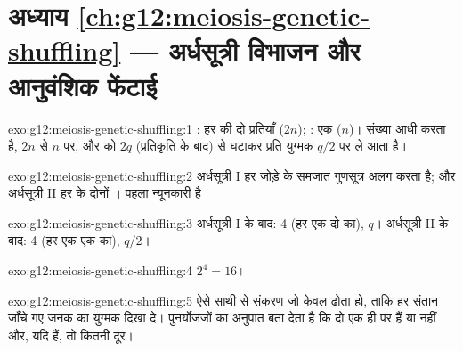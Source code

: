 \section*{अध्याय \ref{ch:g12:meiosis-genetic-shuffling} --- अर्धसूत्री विभाजन और आनुवंशिक फेंटाई}

\begin{solution}{exo:g12:meiosis-genetic-shuffling:1}
: हर  की दो प्रतियाँ ($2n$); : एक ($n$)।   संख्या आधी करता है, $2n$ से $n$ पर, और  को $2q$
(प्रतिकृति के बाद) से घटाकर प्रति युग्मक $q/2$ पर ले आता है।
\end{solution}

\begin{solution}{exo:g12:meiosis-genetic-shuffling:2}
अर्धसूत्री I हर जोड़े के समजात गुणसूत्र अलग करता है; और अर्धसूत्री II हर
 के दोनों । पहला न्यूनकारी है।
\end{solution}

\begin{solution}{exo:g12:meiosis-genetic-shuffling:3}
अर्धसूत्री I के बाद: 4  (हर एक दो  का),  $q$। अर्धसूत्री
II के बाद: 4  (हर एक एक  का),  $q/2$।
\end{solution}

\begin{solution}{exo:g12:meiosis-genetic-shuffling:4}
$2^4 = 16$।
\end{solution}

\begin{solution}{exo:g12:meiosis-genetic-shuffling:5}
ऐसे साथी से संकरण जो केवल   ढोता हो, ताकि हर संतान
जाँचे गए जनक का युग्मक दिखा दे। पुनर्योजजों का अनुपात बता देता है कि दो 
एक ही  पर हैं या नहीं और, यदि हैं, तो कितनी दूर।
\end{solution}


